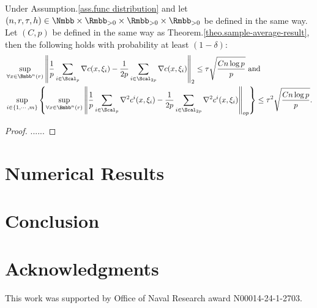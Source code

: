\begin{lemma}
\label{lemma:c_p c_q}
Under Assumption.\ref{ass.func distribution} and let $(n,r,\tau,h)\in\Nmbb\times\Rmbb_{>0}\times\Rmbb_{>0}\times\Rmbb_{>0}$ be defined in the same way. Let $(C,p)$ be defined in the same way as Theorem.\ref{theo.sample-average-result}, then the following holds with probability at least $(1-\delta)$:
	\begin{equation}
	\label{ineq:diff p-q result}
	\begin{aligned}
		&\sup_{\forall x\in\Bmbb^n(r)}\left\|\frac{1}{p}\sum_{i\in\Scal_p}\nabla c(x,\xi_i)-\frac{1}{2p}\sum_{i\in\Scal_{2p}}\nabla c(x,\xi_i)\right\|_2\le  \tau\sqrt{\frac{Cn\log p}{p}}\text{ and}\\
		&\sup_{i\in\{1,\cdots, m\}}\left\{\sup_{\forall x\in\Bmbb^n(r)}\left\|\frac{1}{p}\sum_{i\in\Scal_p}\nabla^2 c^i(x,\xi_i)-\frac{1}{2p}\sum_{i\in\Scal_{2p}}\nabla^2 c^i(x,\xi_i)\right\|_{op}\right\}\le  \tau^2\sqrt{\frac{Cn\log p}{p}}.	
		\end{aligned}
\end{equation}
\end{lemma}

\begin{proof}
	......
\end{proof}

\section{Numerical Results}\label{sec.numerical}

\section{Conclusion}\label{sec.conclusion}

\section{Acknowledgments}\label{sec.acknowledgments}

This work was supported by Office of Naval Research award N00014-24-1-2703.